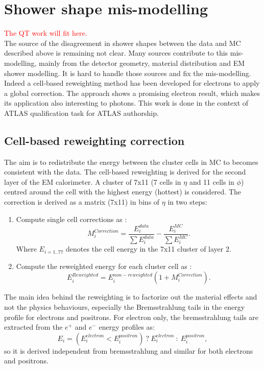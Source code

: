 \section{Shower shape mis-modelling}
\label{gamma:ss}
\textcolor{red}{The QT work will fit here. \\} 
The source of the disagreement in shower shapes between the data and MC described above is remaining not clear. Many sources contribute to this mis-modelling, mainly from the detector geometry, material distribution and EM shower modelling. It is hard to handle those sources and fix the mis-modelling. Indeed a cell-based reweighting method has been developed for electrons to apply a global correction. The approach shows a promising electron result, which makes its application also interesting to photons. This work is done in the context of ATLAS qualification task for ATLAS authorship.
\subsection{Cell-based reweighting correction}
\label{gamma:ss:reweighting}
The aim is to redistribute the energy between the cluster cells in MC to becomes consistent with the data. The cell-based reweighting is derived for the second layer of the EM calorimeter. A cluster of 7x11 (7 cells in $\eta$ and 11 cells in $\phi$) centred around the cell with the highest energy (hottest) is considered. The correction is derived as a matrix (7x11) in bins of $\eta$ in two steps:
\begin{enumerate}
    \item Compute single cell corrections as : 
    \begin{equation}
        M_{i}^{Correction} = \frac{E_{i}^{data}}{\sum E_{i}^{data}} -  \frac{E_{i}^{MC}}{\sum E_{i}^{MC}}.
    \end{equation}
    Where $ E_{i = 1.. 77}$ denotes the cell energy in the 7x11 cluster of layer 2. 
    \item Compute the reweighted energy for each cluster cell as : 
    \begin{equation}
        E_{i}^{Reweighted} = E_{i}^{non-reweighted}(1+M_{i}^{Correction}).
    \end{equation}
\end{enumerate}
The main idea behind the reweighting is to factorize out the material effects and not the physics behaviours, especially the Bremsstrahlung tails in the energy profile for electrons and positrons. For electron only, the bremsstrahlung tails are extracted from the $e^+$ and $e^-$ energy profiles as: 
\begin{equation}
    E_{i} = (E_{i}^{electron} <  E_{i}^{positron}) \ ? \ E_{i}^{electron} \ : \  E_{i}^{positron},
\end{equation}
so it is derived independent from bremsstrahlung and similar for both electrons and positrons.
